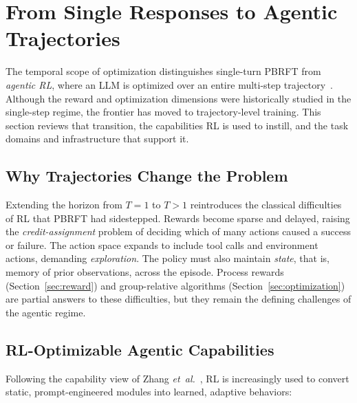\section{From Single Responses to Agentic Trajectories}\label{sec:agentic}

The temporal scope of optimization distinguishes single-turn PBRFT from
\emph{agentic RL}, where an LLM is optimized over an entire multi-step
trajectory~\cite{zhang2026landscape}. Although the reward and
optimization dimensions were historically studied in the single-step
regime, the frontier has moved to trajectory-level training. This section
reviews that transition, the capabilities RL is used to instill, and the
task domains and infrastructure that support it.

\subsection{Why Trajectories Change the Problem}

Extending the horizon from $T{=}1$ to $T{>}1$ reintroduces the classical
difficulties of RL that PBRFT had sidestepped. Rewards become sparse and
delayed, raising the \emph{credit-assignment} problem of deciding which
of many actions caused a success or failure. The action space expands to
include tool calls and environment actions, demanding
\emph{exploration}. The policy must also maintain \emph{state}, that is,
memory of prior observations, across the episode. Process rewards
(Section~\ref{sec:reward}) and group-relative algorithms
(Section~\ref{sec:optimization}) are partial answers to these
difficulties, but they remain the defining challenges of the agentic
regime.

\subsection{RL-Optimizable Agentic Capabilities}

Following the capability view of Zhang \textit{et~al.}~\cite{zhang2026landscape},
RL is increasingly used to convert static, prompt-engineered modules into
learned, adaptive behaviors:

